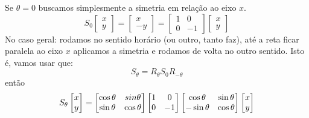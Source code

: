 \documentclass{beamer}
\begin{document}
\begin{frame}
  Se $\theta =0$ buscamos simplesmente a simetria em relação ao eixo $x$.
  $$ S_0\begin{bmatrix}
    x \\ y
  \end{bmatrix} = \begin{bmatrix}
    x \\ -y
  \end{bmatrix} = \begin{bmatrix}
    1 & 0 \\ 0 & -1
  \end{bmatrix}\begin{bmatrix}
    x \\ y
  \end{bmatrix}$$
  No caso geral: rodamos no sentido horário (ou outro, tanto faz), até a reta
  ficar paralela ao eixo $x$ aplicamos a simetria e rodamos de volta no outro sentido.
  Isto é, vamos usar que:
  $$ S_{\theta} = R_\theta S_0 R_{-\theta} $$
  então
  \begin{gather*}
    S_\theta \begin{bmatrix}
      x \\ y
    \end{bmatrix} = \begin{bmatrix}
      \cos\theta & \-sin\theta \\
      \sin\theta & \cos\theta
    \end{bmatrix}\begin{bmatrix}
      1 & 0 \\ 0 & -1 
    \end{bmatrix}\begin{bmatrix}
      \cos\theta & \sin\theta \\ 
      -\sin\theta & \cos\theta
    \end{bmatrix}\begin{bmatrix}
      x \\ y
    \end{bmatrix}
  \end{gather*}

\end{frame}
\end{document}
